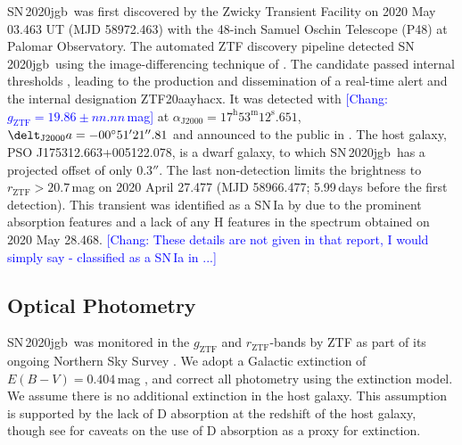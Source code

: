 \documentclass[twocolumn]{aastex631}
\newcommand{\sn}{SN\,2020jgb}
\newcommand{\chang}[1]{\textcolor{blue}{[Chang: #1]}}
\begin{document}
\sn\ was first discovered by the Zwicky Transient Facility \citep[ZTF;][]{ZTF2019a,ZTF2019b} on 2020 May 03.463 UT (MJD 58972.463) with the 48-inch Samuel Oschin Telescope (P48) at Palomar Observatory. The automated ZTF discovery pipeline \citep{Masci_2019} detected \sn\ using the image-differencing technique of \citet{Zackay_imagesub_2016}. The candidate passed internal thresholds \citep[e.g.,][]{Mahabal_ZTFML_2019, Duev_ZTFML_2019}, leading to the production and dissemination of a real-time alert \citep{Patterson_ZTFalert_2019} and the internal designation ZTF20aayhacx. It was detected with \chang{$g_\mathrm{ZTF} = 19.86 \pm nn.nn\,$mag} at $\alpha_\mathrm{J2000}=17^\mathrm{h}53^\mathrm{m}12^\mathrm{s}.651$, $\delt_\mathrm{J2000}a=-00^\circ51'21''.81$ and announced to the public in \citet{Fremling_report_2020}. The host galaxy, PSO J175312.663+005122.078, is a dwarf galaxy, to which \sn\ has a projected offset of only $0.3''$. The last non-detection limits the brightness to $r_\mathrm{ZTF} > 20.7$\,mag on 2020 April 27.477 (MJD 58966.477; 5.99\,days before the first detection). This transient was identified as a SN\,Ia by \citet{TNS_2020} due to the prominent  absorption features and a lack of any H features in the spectrum obtained on 2020 May 28.468. \chang{These details are not given in that report, I would simply say - classified as a SN\,Ia in ...}

\subsection{Optical Photometry}
\sn\ was monitored in the $g_\mathrm{ZTF}$ and $r_\mathrm{ZTF}$-bands by ZTF as part of its ongoing Northern Sky Survey \citep{ZTF2019a}. %
We adopt a Galactic extinction of $E(B-V)=0.404\,$mag \citep{Schlafly2011}, and correct all photometry using the \citet{Fitzpatrick1999} extinction model. We assume there is no additional extinction in the host galaxy. This assumption is supported by the lack of  D absorption at the redshift of the host galaxy, though see \citet{Poznanski_2011} for caveats on the use of  D absorption as a proxy for extinction. 
\end{document}
